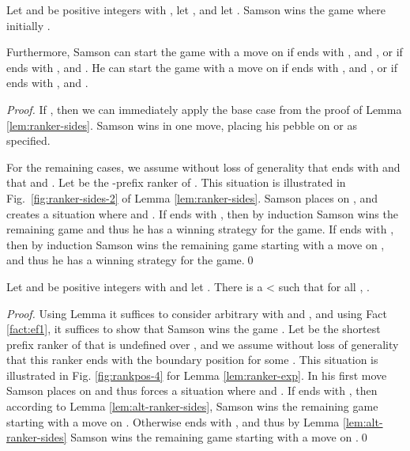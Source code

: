 \documentclass{LMCS}
\newcommand{\qedconf}{}
\renewcommand{\qedconf}{\qed}
\begin{document}
\begin{full}
\begin{lem} \label{lem:alt-ranker-sides} Let  and  be positive
  integers with , let , and let . Samson wins the game 
  where initially .

  Furthermore, Samson can start the game with a move on  if  ends with
  ,  and , or if  ends with
  ,  and . He can start the game with
  a move on  if  ends with ,  and , or if  ends with ,  and .
\end{lem}

\begin{proof}
  If , then we can immediately apply the base case from the proof
  of Lemma \ref{lem:ranker-sides}. Samson wins in one move, placing his
  pebble on  or  as specified.

  For the remaining cases, we assume without loss of generality that 
  ends with  and that  and . Let
   be the -prefix ranker of . This situation is
  illustrated in Fig.~\ref{fig:ranker-sides-2} of Lemma
  \ref{lem:ranker-sides}. Samson places  on , and creates a
  situation where  and . If
   ends with , then by induction Samson wins the remaining
   game and thus he has a winning strategy for the
   game. If  ends with , then by induction
  Samson wins the remaining  game starting with a move on
  , and thus he has a winning strategy for the  game.\qedconf
\end{proof}

\begin{lem} \label{lem:alt-ranker-def} Let  and  be positive
  integers with  and let . There is a 
  < such that for all ,
  .
\end{lem}

\begin{proof}
  Using Lemma  it suffices to consider arbitrary  with  and , and
  using Fact \ref{fact:ef1}, it suffices to show that Samson wins the game
  . 
  Let  be the shortest prefix ranker
  of  that is undefined over , and we assume without loss of
  generality that this ranker ends with the boundary position  for some . This situation is illustrated in Fig.
  \ref{fig:rankpos-4} for Lemma \ref{lem:ranker-exp}. In his first move
  Samson places  on  and thus forces a situation where  and . If  ends with ,
  then according to Lemma \ref{lem:alt-ranker-sides}, Samson wins the
  remaining  game starting with a move on . Otherwise
   ends with , and thus by Lemma
  \ref{lem:alt-ranker-sides} Samson wins the remaining
   game
  starting with a move on .\qedconf
\end{proof}


\end{full}
\end{document}
